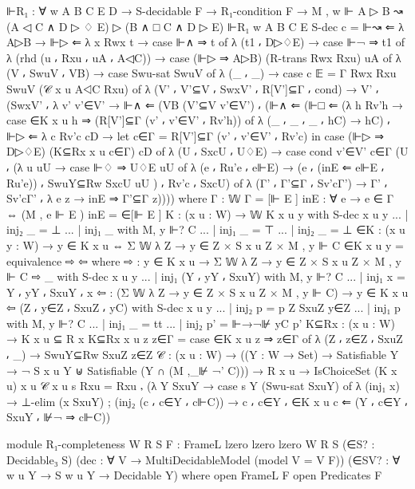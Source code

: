 \begin{spverbatim}
  ⊩R₁ : ∀ {w A B C E D} → S-decidable F → R₁-condition F
    → M , w ⊩ A ▷ B ↝ (A ◁ C ∧ D ▷ ♢ E) ▷ (B ∧ □ C ∧ D ▷ E)
  ⊩R₁ {w} {A} {B} {C} {E} S-dec c = ⊩↝ ⇐ λ A▷B → ⊩▷ ⇐ λ {x} Rwx t → case ⊩∧ ⇒ t of
    λ { (t1 ⸴ D▷♢E) → case ⊩¬ ⇒ t1 of λ { (rhd (u ⸴ Rxu ⸴ uA ⸴ A◁C))
    → case (⊩▷ ⇒ A▷B) (R-trans Rwx Rxu) uA of λ { (V ⸴ SwuV ⸴ VB) →
    case Swu-sat SwuV of λ { (_ ⸴ _) →
    case c {𝔼 = Γ} Rwx Rxu SwuV (𝒞 x u A◁C Rxu)
    of λ { (V' ⸴ V'⊆V ⸴ SwxV' ⸴ R[V']⊆Γ ⸴ cond) → V' ⸴ (SwxV' ⸴ λ { {v'} v'∈V'
    → ⊩∧ ⇐ (VB (V'⊆V v'∈V') ⸴ (⊩∧ ⇐ (⊩□ ⇐ (λ {h} Rv'h →
    case ∈K x u h  ⇒ (R[V']⊆Γ (v' ⸴ v'∈V' ⸴ Rv'h)) of
    λ { (_ ⸴ _ ⸴ _ ⸴ hC) → hC})
    ⸴ ⊩▷ ⇐ λ { {c} Rv'c cD → let c∈Γ = R[V']⊆Γ (v' ⸴ v'∈V' ⸴ Rv'c) in
    case (⊩▷ ⇒ D▷♢E) (K⊆Rx x u c∈Γ) cD
    of λ { (U ⸴ SxcU ⸴ U♢E) → case cond v'∈V' c∈Γ (U ⸴ (λ {u} uU → case ⊩♢ ⇒ U♢E uU of
    λ { (e ⸴ Ru'e ⸴ e⊩E) → (e ⸴ (inE ⇐ e⊩E ⸴ Ru'e)) ⸴ SwuY⊆Rw SxcU uU }) ⸴ Rv'c ⸴ SxcU) of
      λ { (Γ' ⸴ Γ'⊆Γ ⸴ Sv'cΓ') → Γ' ⸴ Sv'cΓ' ⸴ λ { {e} z → inE ⇒ Γ'⊆Γ z}}}})))})}}}}}
    where
      Γ : 𝕎
      Γ = [⊩ E ]
      inE : ∀ {e} → e ∈ Γ ⇔ (M , e ⊩ E )
      inE = ∈[⊩ E ]
      K : (x u : W) → 𝕎
      K x u y with S-dec x u y
      ... | inj₂ _ = ⊥
      ... | inj₁ _ with M, y ⊩? C
      ... | inj₁ _ = ⊤
      ... | inj₂ _ = ⊥
      ∈K : (x u y : W) → y ∈ K x u ⇔ Σ 𝕎 λ Z → y ∈ Z × S x u Z × M , y ⊩ C
      ∈K x u y = equivalence ⇨ ⇦
        where
        ⇨ : y ∈ K x u → Σ 𝕎 λ Z → y ∈ Z × S x u Z × M , y ⊩ C
        ⇨ _ with S-dec x u y
        ... | inj₁ (Y ⸴ yY ⸴ SxuY) with M, y ⊩? C
        ... | inj₁ x = Y ⸴ yY ⸴ SxuY ⸴ x
        ⇦ : (Σ 𝕎 λ Z → y ∈ Z × S x u Z × M , y ⊩ C) → y ∈ K x u
        ⇦ (Z ⸴ y∈Z ⸴ SxuZ ⸴ yC) with S-dec x u y
        ... | inj₂ p = p Z SxuZ y∈Z
        ... | inj₁ p with M, y ⊩? C
        ... | inj₁ _ = tt
        ... | inj₂ p' = ⊩→¬⊮ yC p'
      K⊆Rx : (x u : W) → K x u ⊆ R x
      K⊆Rx x u {z} z∈Γ = case ∈K x u z ⇒ z∈Γ of λ { (Z ⸴ z∈Z ⸴ SxuZ ⸴ _) → SwuY⊆Rw SxuZ z∈Z}
      𝒞 : (x u : W)
        → ((Y : W → Set) → Satisfiable Y → ¬ S x u Y ⊎ Satisfiable (Y ∩ (M ,_⊮ ¬' C)))
          → R x u → IsChoiceSet (K x u) x u
      𝒞 x u s Rxu = Rxu ⸴ (λ {Y} SxuY → case s Y (Swu-sat SxuY) of
        λ { (inj₁ x) → ⊥-elim (x SxuY) ; (inj₂ (c ⸴ c∈Y ⸴ c⊩C)) → c ⸴ c∈Y ⸴
        ∈K x u c ⇐ (Y ⸴ c∈Y ⸴ SxuY ⸴ ⊮¬ ⇒ c⊩C)})


module R₁-completeness
  {W R S}
  {F : FrameL {lzero} {lzero} {lzero} W R S}
  (∈S? : Decidable₃ S)
  (dec : ∀ V → MultiDecidableModel (model {V = V} F))
  (∈SV? : ∀ {w u Y} → S w u Y → Decidable Y)
  where
  open FrameL F
  open Predicates F


\end{spverbatim}
